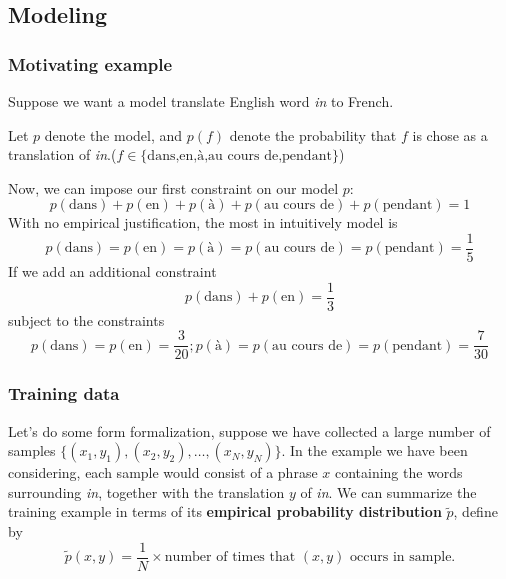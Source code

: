 \documentclass[slidestop,compress,mathserif]{beamer}
\begin{document}
	\subsection{Modeling}
	\begin{frame}[shrink]
		\frametitle{Motivating example}
		Suppose we want a model translate English word \textit{in} to French.
		
		Let $p$ denote the model, and $p(f)$ denote the probability that $f$ is chose as a translation of \textit{in}.($f \in \{\mbox{dans,en,\`{a},au cours de,pendant}\}$)
		
		Now, we can impose our first constraint on our model $p$:
		$$p(\mbox{dans})+p(\mbox{en})+p(\mbox{\`a})+p(\mbox{au cours de})+p(\mbox{pendant}) = 1$$
		With no empirical justification, the most in intuitively model is
		$$p(\mbox{dans})=p(\mbox{en})=p(\mbox{\`a})=p(\mbox{au cours de})=p(\mbox{pendant})=\frac{1}{5}$$
		If we add an additional constraint
		$$p(\mbox{dans})+p(\mbox{en}) = \frac{1}{3}$$
		subject to the constraints
		$$p(\mbox{dans})=p(\mbox{en})=\frac{3}{20};p(\mbox{\`a})=p(\mbox{au cours de})=p(\mbox{pendant})=\frac{7}{30} $$
		
	\end{frame}
	
	\begin{frame}
		\frametitle{Training data}
		Let's do some form formalization, suppose we have collected a large number of samples $\{(x_1,y_1),(x_2,y_2),\ldots,(x_N,y_N)\}$.
		\newline
		\newline
		In the example we have been considering, each sample would consist of a phrase $x$ containing the words surrounding \textit{in}, together with the translation $y$ of \textit{in}.
		\newline
		\newline
		We can summarize the training example in terms of its \textbf{empirical probability distribution} $\widetilde{p}$, define by
		$$\widetilde{p}(x,y) = \frac{1}{N} \times \mbox{number of times that $(x,y)$ occurs in sample}.$$
	\end{frame}
	
\end{document}
